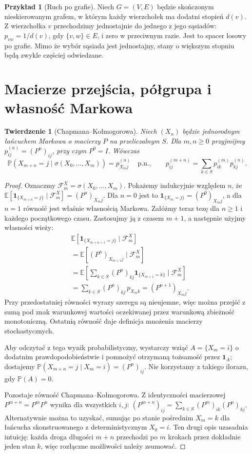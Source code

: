 \documentclass[11pt,a4paper,oneside]{report}
\numberwithin{equation}{chapter}
\theoremstyle{plain}
\newtheorem{twierdzenie}{Twierdzenie}[chapter]
\theoremstyle{definition}
\newtheorem{przyklad}{Przykład}[chapter]
\theoremstyle{remark}
\newcommand{\Prob}{\mathbb{P}}
\newcommand{\E}{\mathbb{E}}
\newcommand{\ind}[1]{\mathbf{1}_{#1}}
\begin{document}
\begin{przyklad}[Ruch po grafie]
Niech $G=(V,E)$ będzie skończonym nieskierowanym grafem,
w którym każdy wierzchołek ma dodatni stopień $d(v)$.
Z wierzchołka $v$ przechodzimy jednostajnie do jednego
z jego sąsiadów: $p_{vw}=1/d(v)$, gdy $\{v,w\}\in E$,
i zero w przeciwnym razie. Jest to spacer losowy
po grafie. Mimo że wybór sąsiada jest jednostajny,
stany o większym stopniu będą zwykle częściej odwiedzane.
\end{przyklad}

\section{Macierze przejścia, półgrupa i własność Markowa}

\begin{twierdzenie}[Chapmana--Kołmogorowa]
Niech $(X_n)$ będzie jednorodnym łańcuchem Markowa
o macierzy $P$ na przeliczalnym $S$. Dla $m,n\geq0$
przyjmijmy $p_{ij}^{(n)}=(P^n)_{ij}$, przy czym
$P^0=I$. Wówczas
\[
\Prob(X_{m+n}=j\mid\sigma(X_0,\ldots,X_m))
=p^{(n)}_{X_mj}\quad\text{p.n.},\qquad
p_{ij}^{(m+n)}=\sum_{k\in S}p_{ik}^{(m)}p_{kj}^{(n)}.
\]
\end{twierdzenie}
\begin{proof}
Oznaczmy $\mathcal F_m^X=\sigma(X_0,\ldots,X_m)$.
Pokażemy indukcyjnie względem $n$, że
$\E[\ind{\{X_{m+n}=j\}}\mid\mathcal F_m^X]
=(P^n)_{X_mj}$. Dla $n=0$ jest to
$\ind{\{X_m=j\}}=(P^0)_{X_mj}$, a dla $n=1$
równość jest właśnie własnością Markowa.
Załóżmy teraz tezę dla $n\geq1$ i każdego
początkowego czasu. Zastosujmy ją z czasem $m+1$,
a następnie użyjmy własności wieży:
\begin{align*}
&\E[\ind{\{X_{m+n+1}=j\}}\mid\mathcal F_m^X]\\
&=\E[(P^n)_{X_{m+1}j}\mid\mathcal F_m^X]\\
&=\E\left[\sum_{k\in S}(P^n)_{kj}
 \ind{\{X_{m+1}=k\}}\mid\mathcal F_m^X\right]\\
&=\sum_{k\in S}(P^n)_{kj}\,p_{X_mk}
 =(P^{n+1})_{X_mj}.
\end{align*}
Przy przedostatniej równości wyrazy szeregu są
nieujemne, więc można przejść z sumą pod znak
warunkowej wartości oczekiwanej przez warunkową
zbieżność monotoniczną. Ostatnią równość daje
definicja mnożenia macierzy stochastycznych.

Aby odczytać z tego wynik probabilistyczny,
wystarczy wziąć $A=\{X_m=i\}$ o dodatnim
prawdopodobieństwie i pomnożyć otrzymaną
tożsamość przez $\ind A$; dostajemy
$\Prob(X_{m+n}=j\mid X_m=i)=(P^n)_{ij}$.
Nie korzystamy z takiego ilorazu, gdy $\Prob(A)=0$.

Pozostaje równość Chapmana--Kołmogorowa. Z
identyczności macierzowej $P^{m+n}=P^mP^n$
wynika dla wszystkich $i,j$:
$(P^{m+n})_{ij}=\sum_{k\in S}(P^m)_{ik}(P^n)_{kj}$.
Alternatywnie można to uzyskać, sumując po stanie
pośrednim $X_m=k$ dla łańcucha skonstruowanego
z deterministycznym $X_0=i$. Ten drugi opis
uzasadnia intuicję: każda droga długości $m+n$
przechodzi po $m$ krokach przez dokładnie jeden
stan $k$, więc rozłączne możliwości należy zsumować.
\end{proof}
\end{document}
